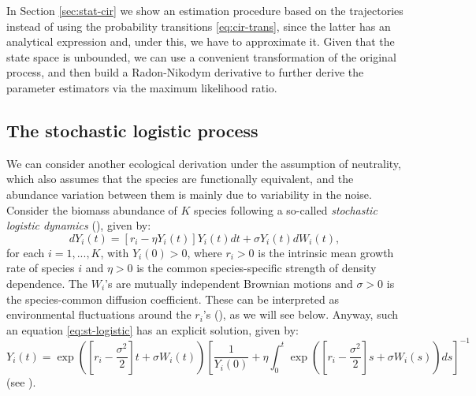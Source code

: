 \documentclass[12pt]{article}
\begin{document}
In Section \ref{sec:stat-cir} we show an estimation procedure based on the trajectories instead of using the probability transitions \eqref{eq:cir-trans}, since the latter has an analytical expression and, under this, we have to approximate it. Given that the state space is unbounded, we can use a convenient transformation of the original process, and then build a Radon-Nikodym derivative to further derive the parameter estimators via the maximum likelihood ratio.

\subsection{The stochastic logistic process}\label{sec:logistic}

We can consider another ecological derivation under the assumption of neutrality, which also assumes that the species  are functionally equivalent, and the abundance variation between them is mainly due to variability in the noise. Consider the biomass abundance of $K$ species following a so-called \textit{stochastic logistic dynamics} (\citep{pasquali2001stochastic}), given by:
\begin{equation}\label{eq:st-logistic}
dY_i(t)=[r_i-\eta Y_i(t)]Y_i(t)dt+\sigma Y_i(t)dW_i(t),    
\end{equation}
for each $i=1,...,K$, with $Y_i(0)>0$, where $r_i>0$ is the intrinsic mean growth rate of species $i$ and $\eta>0$ is the common species-specific strength of density dependence.  The $W_i$'s are mutually independent Brownian motions and $\sigma>0$ is the species-common diffusion coefficient. These can be interpreted as environmental fluctuations around the $r_i$'s (\citep{may2001stability}), as we will see below. Anyway,  such an equation \eqref{eq:st-logistic} has an explicit solution, given by:
\begin{equation}\label{eq:exac-sol-SL}
Y_i(t)=\exp\left(\left[r_i-\frac{\sigma^2}{2}\right]t+\sigma W_i(t)\right)\left[\frac{1}{Y_i(0)}+\eta\int_{0}^{t}\exp\left(\left[r_i-\frac{\sigma^2}{2}\right]s+\sigma W_i(s)\right)ds\right]^{-1}
\end{equation}
(see \citep{arato2003famous}).
\end{document}
